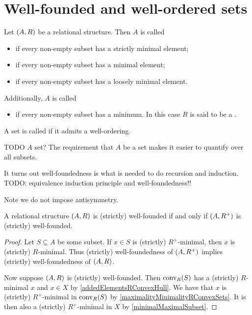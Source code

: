 \section{Well-founded and well-ordered sets}
\begin{definition}
Let $\sSet{A,R}$ be a relational structure.
Then $A$ is called
\begin{itemize}
\item {} if every non-empty subset has a strictly minimal element;
\item {} if every non-empty subset has a minimal element;
\item {} if every non-empty subset has a loosely minimal element.
\end{itemize}
Additionally, $A$ is called
\begin{itemize}
\item {} if every non-empty subset has a minimum. In this case $R$ is said to be a .
\end{itemize}
A set is called  if it admits a well-ordering.
\end{definition}
TODO $A$ set? The requirement that $A$ be a set makes it easier to quantify over all subsets.

It turns out well-foundedness is what is needed to do recursion and induction. TODO: equivalence induction principle and well-foundedness!!

Note we do not impose antisymmetry.

\begin{proposition}
A relational structure $\sSet{A,R}$ is (strictly) well-founded \textup{if and only if} $\sSet{A,R^+}$ is (strictly) well-founded.
\end{proposition}
\begin{proof}
Let $S \subseteq A$ be some subset. If $x\in S$ is (strictly) $R^+$-minimal, then $x$ is (strictly) $R$-minimal. Thus (strictly) well-foundedness of $\sSet{A,R^+}$ implies (strictly) well-foundedness of $\sSet{A,R}$.

Now suppose $\sSet{A,R}$ is (strictly) well-founded. Then $\operatorname{conv}_R(S)$ has a (strictly) $R$-minimal $x$ and $x\in X$ by \ref{addedElementsRConvexHull}. We have that $x$ is (strictly) $R^+$-minimal in $\operatorname{conv}_R(S)$ by \ref{maximalityMinimalityRConvexSets}. It is then also a (strictly) $R^+$-minimal in $X$ by \ref{minimalMaximalSubset}.
\end{proof}

